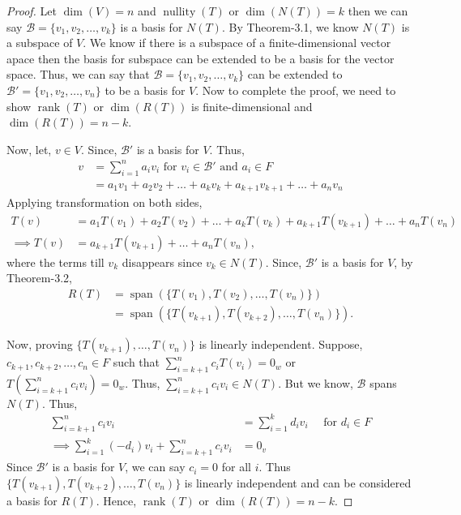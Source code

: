 \documentclass[12pt, a4paper]{article}
\theoremstyle{definition}
\theoremstyle{remark}
\newcommand{\B}{\mathscr{B}}
\DeclareMathOperator{\Span}{span}
\DeclareMathOperator{\nullity}{nullity}
\DeclareMathOperator{\rank}{rank}
\begin{document}
\begin{proof}
    Let $\dim(V) = n$ and $\nullity(T)$ or $\dim(N(T)) = k$ then we can say $\B = \{v_1, v_2, \dots, v_k\}$ is a basis for $N(T)$. By Theorem-3.1, we know $N(T)$ is a subspace of $V$. We know if there is a subspace of a finite-dimensional vector apace then the basis for subspace can be extended to be a basis for the vector space. Thus, we can say that $\B = \{v_1, v_2, \dots, v_k\}$ can be extended to $\B' = \{v_1, v_2, \dots, v_n\}$ to be a basis for $V$. Now to complete the proof, we need to show $\rank(T)$ or $\dim(R(T))$ is finite-dimensional and $\dim(R(T)) = n - k$. 

    Now, let, $v \in V$. Since, $\B'$ is a basis for $V$. Thus,
    \begin{align*}
        v &= \sum_{i=1}^{n} a_i v_i \text{ for } v_i \in \B' \text{ and } a_i \in F \\
        &= a_1 v_1 + a_2 v_2 + \dots + a_k v_k + a_{k+1} v_{k+1} + \dots + a_n v_n
    \end{align*}
    Applying transformation on both sides,
    \begin{align*}
         T(v) &= a_1 T(v_1) + a_2 T(v_2) + \dots + a_k T(v_k) + a_{k+1} T(v_{k+1}) + \dots + a_n T(v_n) \\
         \implies T(v) &= a_{k+1} T(v_{k+1}) + \dots + a_n T(v_n),
    \end{align*}
    where the terms till $v_k$ disappears since $v_k \in N(T)$. Since, $\B'$ is a basis for $V$, by Theorem-3.2,
    \begin{align*}
        R(T) &= \Span(\{T(v_1), T(v_2), \dots, T(v_n)\})\\
        &= \Span(\{T(v_{k+1}), T(v_{k+2}), \dots, T(v_n)\}).
    \end{align*}

    Now, proving $\{T(v_{k+1}), \dots, T(v_n)\}$ is linearly independent. Suppose,
    $c_{k+1}, c_{k+2}, \dots, c_n \in F$ such that $\displaystyle\sum_{i=k+1}^{n} c_i T(v_i) = 0_w$ or $T\left(\displaystyle\sum_{i=k+1}^{n} c_i v_i\right) = 0_w$. Thus, $\displaystyle\sum_{i=k+1}^{n} c_i v_i \in N(T)$. But we know, $\B$ spans $N(T)$. Thus,
    \begin{align*}
        \sum_{i=k+1}^n c_iv_i &= \sum_{i=1}^k d_iv_i \quad \text{ for } d_i \in F \\
        \implies \sum_{i=1}^k (-d_i)v_i + \sum_{i=k+1}^n c_iv_i &= 0_v
    \end{align*}
    Since $\B'$ is a basis for $V$, we can say $c_i = 0$ for all $i$. Thus $\{T(v_{k+1}), T(v_{k+2}), \ldots, T(v_n)\}$ is linearly independent and can be considered a basis for $R(T)$. Hence, $\rank(T)$ or $\dim(R(T)) = n-k$.
\end{proof}
\end{document}

